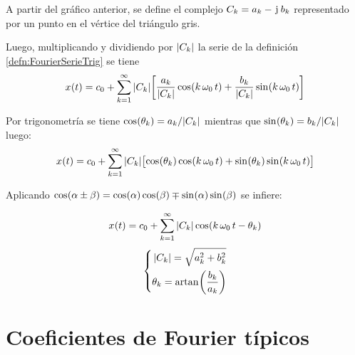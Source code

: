 \begin{center}
    \def\svgwidth{0.6\linewidth}
    
\end{center}

A partir del gráfico anterior, se define el complejo $C_\kth = a_\kth - \iu \, b_\kth$ representado por un punto en el vértice del triángulo gris.

Luego, multiplicando y dividiendo por $\norm{C_\kth}$ la serie de la definición \ref{defn:FourierSerieTrig} se tiene
\[
    \fx[x]{t} = c_0 + \sum_{\kth=1}^{\infty} \norm{C_\kth} \inBrackets{ \dfrac{a_\kth}{\norm{C_\kth}} \fx[\cos]{\kth \, \omega_0 \, t} + \dfrac{b_\kth}{\norm{C_\kth}} \fx[\sin]{\kth \, \omega_0 \, t} }
\]

Por trigonometría se tiene $\fx[\cos]{\theta_\kth} = a_\kth / \norm{C_\kth}$ mientras que $\fx[\sin]{\theta_\kth} = b_\kth / \norm{C_\kth}$ luego:
\[
    \fx[x]{t} = c_0 + \sum_{\kth=1}^{\infty} \norm{C_\kth} \inBrackets{ \fx[\cos]{\theta_\kth} \fx[\cos]{\kth \, \omega_0 \, t} + \fx[\sin]{\theta_\kth} \fx[\sin]{\kth \, \omega_0 \, t} }
\]

Aplicando $\fx[\cos]{\alpha \pm \beta} = \fx[\cos]{\alpha} \fx[\cos]{\beta} \mp \fx[\sin]{\alpha} \fx[\sin]{\beta}$ se infiere:

\begin{mdframed}[style=DefinitionFrame]
    \begin{defn}
        \label{defn:FourierSerieArm}
    \end{defn}
    \[
        \fx[x]{t} = c_0 + \sum_{\kth=1}^{\infty} \norm{C_\kth} \fx[\cos]{\kth \, \omega_0 \, t - \theta_\kth}
    \]
    \[
    \left\{
    \begin{aligned}
        \norm{C_\kth} = \sqrt{a_\kth^2 + b_\kth^2}
        \\
        \theta_\kth = \fx[\artan]{\frac{b_\kth}{a_\kth}}
    \end{aligned}
    \right.
\]
\end{mdframed}

\section{Coeficientes de Fourier típicos}


